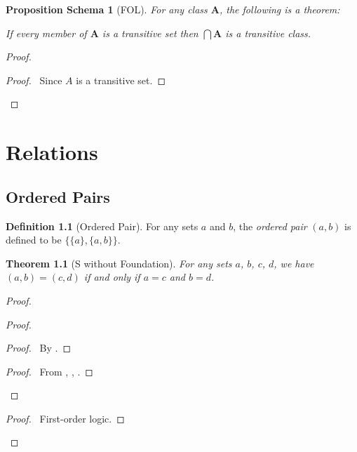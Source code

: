 \documentclass{book}
\let\qed\relax
\newtheorem{props}[ax]{Proposition Schema}
\newtheorem{thm}[ax]{Theorem}
\theoremstyle{definition}
\newtheorem{df}[ax]{Definition}
\begin{document}
\begin{props}[FOL]
\label{prop:inttransitive}
For any class $\mathbf{A}$, the following is a theorem:

If every member of $\mathbf{A}$ is a transitive set then $\bigcap \mathbf{A}$ is a transitive class.
\end{props}

\begin{proof}
\pf
{}
\begin{proof}
	\pf\ Since $A$ is a transitive set.
\end{proof}
\qed
\end{proof}

\chapter{Relations}

\section{Ordered Pairs}

\begin{df}[Ordered Pair]
For any sets $a$ and $b$, the \emph{ordered pair} $(a,b)$ is defined to be $\{ \{ a \}, \{a , b \} \}$.
\end{df}

\begin{thm}[S without Foundation]
For any sets $a$, $b$, $c$, $d$, we have $(a,b) = (c,d)$ if and only if $a = c$ and $b = d$.
\end{thm}

\begin{proof}
\pf
{}
\begin{proof}
	\begin{proof}
		\pf\ By .
	\end{proof}
	\begin{proof}
		\pf\ From , , .
	\end{proof}
\end{proof}
\begin{proof}
	\pf\ First-order logic.
\end{proof}
\qed
\end{proof}
\end{document}
